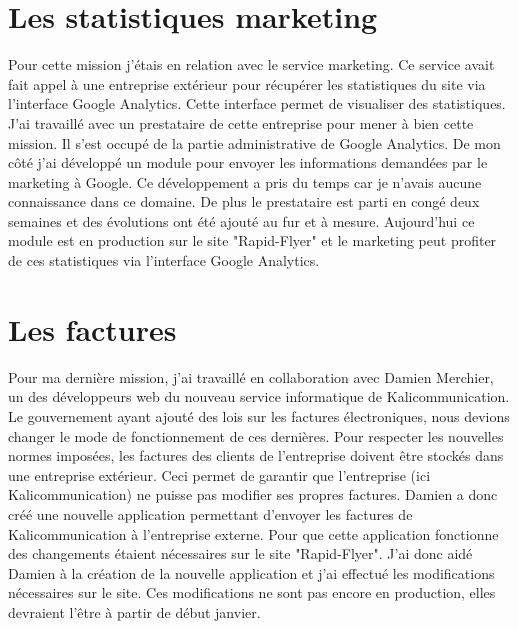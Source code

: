 \section{Les statistiques marketing}
Pour cette mission j'étais en relation avec le service marketing. Ce service avait fait appel à une entreprise extérieur pour récupérer les statistiques du site via l'interface Google Analytics. Cette interface permet de visualiser des statistiques.\newline
J'ai travaillé avec un prestataire de cette entreprise pour mener à bien cette mission. Il s'est occupé de la partie administrative de Google Analytics. De mon côté j'ai développé un module pour envoyer les informations demandées par le marketing à Google. Ce développement a pris du temps car je n'avais aucune connaissance dans ce domaine. De plus le prestataire est parti en congé deux semaines et des évolutions ont été ajouté au fur et à mesure. Aujourd'hui ce module est en production sur le site "Rapid-Flyer" et le marketing peut profiter de ces statistiques via l'interface Google Analytics.

\section{Les factures}
Pour ma dernière mission, j'ai travaillé en collaboration avec Damien Merchier, un des développeurs web du nouveau service informatique de Kalicommunication.\newline
Le gouvernement ayant ajouté des lois sur les factures électroniques, nous devions changer le mode de fonctionnement de ces dernières. Pour respecter les nouvelles normes imposées, les factures des clients de l'entreprise doivent être stockés dans une entreprise extérieur. Ceci permet de garantir que l'entreprise (ici Kalicommunication) ne puisse pas modifier ses propres factures.\newline
Damien a donc créé une nouvelle application permettant d'envoyer les factures de Kalicommunication à l'entreprise externe. Pour que cette application fonctionne des changements étaient nécessaires sur le site "Rapid-Flyer". J'ai donc aidé Damien à la création de la nouvelle application et j'ai effectué les modifications nécessaires sur le site. Ces modifications ne sont pas encore en production, elles devraient l'être à partir de début janvier.